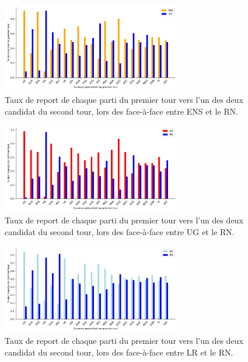 \documentclass[11pt]{article}
\begin{document}
            \begin{figure}
                \begin{center}
                    \includegraphics[width=0.7\textwidth]{Focus_ENS_RN.pdf}
                    \caption{Taux de report de chaque parti du premier tour vers l'un des deux candidat du second tour, lors des face-à-face entre ENS et le RN.}
                    \label{fig:ENS-RN}
                \end{center}
            \end{figure}
            \begin{figure}
                \begin{center}
                    \includegraphics[width=0.7\textwidth]{Focus_UG_RN.pdf}
                    \caption{Taux de report de chaque parti du premier tour vers l'un des deux candidat du second tour, lors des face-à-face entre UG et le RN.}
                    \label{fig:UG-RN}
                \end{center}
            \end{figure}
            \begin{figure}
                \begin{center}
                    \includegraphics[width=0.7\textwidth]{Focus_LR_RN.pdf}
                    \caption{Taux de report de chaque parti du premier tour vers l'un des deux candidat du second tour, lors des face-à-face entre LR et le RN.}
                    \label{fig:LR-RN}
                \end{center}
            \end{figure}
\end{document}
